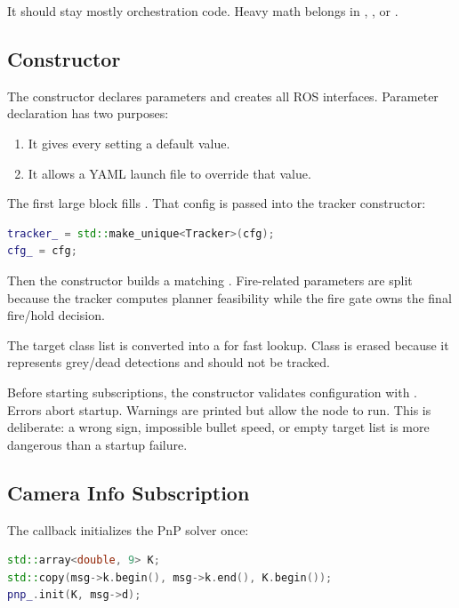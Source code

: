 It should stay mostly orchestration code. Heavy math belongs in
, , or .

\subsection{Constructor}

The constructor declares parameters and creates all ROS interfaces. Parameter
declaration has two purposes:

\begin{enumerate}
  \item It gives every setting a default value.
  \item It allows a YAML launch file to override that value.
\end{enumerate}

The first large block fills . That config is passed into
the tracker constructor:

\begin{lstlisting}[language=C++]
tracker_ = std::make_unique<Tracker>(cfg);
cfg_ = cfg;
\end{lstlisting}

Then the constructor builds a matching . Fire-related
parameters are split because the tracker computes planner feasibility while
the fire gate owns the final fire/hold decision.

The target class list is converted into a  for
fast lookup. Class  is erased because it represents grey/dead
detections and should not be tracked.

Before starting subscriptions, the constructor validates configuration with
. Errors abort startup. Warnings are printed
but allow the node to run. This is deliberate: a wrong sign, impossible bullet
speed, or empty target list is more dangerous than a startup failure.

\subsection{Camera Info Subscription}

The  callback initializes the PnP solver once:

\begin{lstlisting}[language=C++]
std::array<double, 9> K;
std::copy(msg->k.begin(), msg->k.end(), K.begin());
pnp_.init(K, msg->d);
\end{lstlisting}

